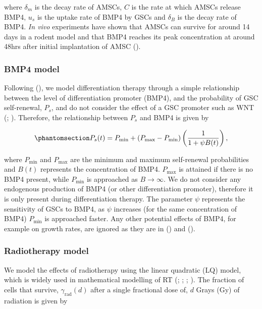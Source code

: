 \documentclass[
  letterpaper,
]{scrreprt}
\theoremstyle{definition}
\theoremstyle{remark}
\begin{document}
where \(\delta_m\) is the decay rate of AMSCs, \(C\) is the rate at
which AMSCs release BMP4, \(u_s\) is the uptake rate of BMP4 by GSCs and
\(\delta_B\) is the decay rate of BMP4. \emph{In vivo} experiments have
shown that AMSCs can survive for around 14 days in a rodent model and
that BMP4 reaches its peak concentration at around 48hrs after initial
implantation of AMSC ().

\subsubsection{BMP4 model}\label{sec-BMP4-model}

Following (), we
model differentiation therapy through a simple relationship between the
level of differentiation promoter (BMP4), and the probability of GSC
self-renewal, \(P_s\), and do not consider the effect of a GSC promoter
such as WNT (;
). Therefore, the
relationship between \(P_s\) and BMP4 is given by

\begin{equation}\phantomsection\label{eq-Ps}{
    P_s(t) = P_\text{min} + (P_\text{max} - P_\text{min})  \left( \frac{1}{1 +  \psi B(t)} \right),
}\end{equation}

where \(P_\text{min}\) and \(P_\text{max}\) are the minimum and maximum
self-renewal probabilities and \(B(t)\) represents the concentration of
BMP4. \(P_\text{max}\) is attained if there is no BMP4 present, while
\(P_\text{min}\) is approached as \(B \rightarrow \infty\). We do not
consider any endogenous production of BMP4 (or other differentiation
promoter), therefore it is only present during differentiation therapy.
The parameter \(\psi\) represents the sensitivity of GSCs to BMP4, as
\(\psi\) increases (for the same concentration of BMP4) \(P_\text{min}\)
is approached faster. Any other potential effects of BMP4, for example
on growth rates, are ignored as they are in
() and
().

\subsubsection{Radiotherapy model}\label{sec-RT-model}

We model the effects of radiotherapy using the linear quadratic (LQ)
model, which is widely used in mathematical modelling of RT
(;
;
;
). The fraction of cells that
survive, \(\gamma_{\text{rad}}(d)\) after a single fractional dose of,
\(d\) Grays (Gy) of radiation is given by
\end{document}
